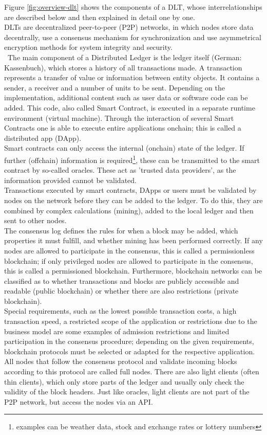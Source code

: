 \documentclass[conference]{IEEEtran}
\begin{document}
Figure \ref{fig:overview-dlt} shows the components of a DLT, whose interrelationships are described below and then explained in detail one by one.\\
DLTs are decentralized peer-to-peer (P2P) networks, in which nodes store data decentrally, use a consensus mechanism for synchronization and use asymmetrical encryption methods for system integrity and security. \cite{DLT2016}\\\
The main component of a Distributed Ledger is the ledger itself (German: Kassenbuch), which stores a history of all transactions made. A transaction represents a transfer of value or information between entity objects. It contains a sender, a receiver and a number of units to be sent. Depending on the implementation, additional content such as user data or software code can be added. This code, also called Smart Contract, is executed in a separate runtime environment (virtual machine). Through the interaction of several Smart Contracts one is able to execute entire applications onchain; this is called a distributed app (DApp).\\
Smart contracts can only access the internal (onchain) state of the ledger. If further (offchain) information is required\footnote{examples can be weather data, stock and exchange rates or lottery numbers}, these can be transmitted to the smart contract by so-called oracles. These act as 'trusted data providers', as the information provided cannot be validated. \cite{ORACLE2019}\\
Transactions executed by smart contracts, DApps or users must be validated by nodes on the network before they can be added to the ledger. To do this, they are combined by complex calculations (mining), added to the local ledger and then sent to other nodes.\\
The consensus log defines the rules for when a block may be added, which properties it must fulfill, and whether mining has been performed correctly. If any nodes are allowed to participate in the consensus, this is called a permissionless blockchain; if only privileged nodes are allowed to participate in the consensus, this is called a permissioned blockchain. Furthermore, blockchain networks can be classified as to whether transactions and blocks are publicly accessible and readable (public blockchain) or whether there are also restrictions (private blockchain).\\
Special requirements, such as the lowest possible transaction costs, a high transaction speed, a restricted scope of the application or restrictions due to the business model are some examples of admission restrictions and limited participation in the consensus procedure; depending on the given requirements, blockchain protocols must be selected or adapted for the respective application. All nodes that follow the consensus protocol and validate incoming blocks according to this protocol are called full nodes. There are also light clients (often thin clients), which only store parts of the ledger and usually only check the validity of the block headers. Just like oracles, light clients are not part of the P2P network, but access the nodes via an API.
\end{document}
